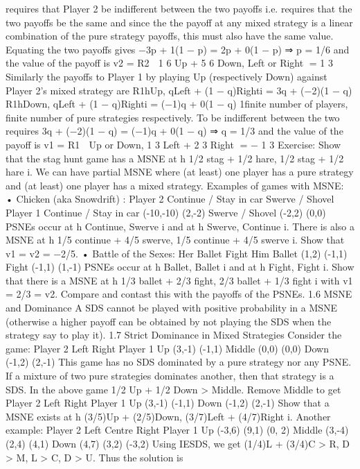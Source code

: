 requires that Player 2 be indifferent between the two payoffs i.e. requires that the two
payoffs be the same and since the the payoff at any mixed strategy is a linear combination
of the pure strategy payoffs, this must also have the same value. Equating the two payoffs
gives
−3p + 1(1 − p) = 2p + 0(1 − p)
⇒ p = 1/6
and the value of the payoff is
v2 = R2

1
6
Up + 5
6
Down, Left or Right
=
1
3
Similarly the payoffs to Player 1 by playing Up (respectively Down) against Player 2’s
mixed strategy are
R1hUp, qLeft + (1 − q)Righti = 3q + (−2)(1 − q)
R1hDown, qLeft + (1 − q)Righti = (−1)q + 0(1 − q)
1finite number of players, finite number of pure strategies
respectively. To be indifferent between the two requires
3q + (−2)(1 − q) = (−1)q + 0(1 − q)
⇒ q = 1/3
and the value of the payoff is
v1 = R1

Up or Down,
1
3
Left + 2
3
Right
= −
1
3
Exercise: Show that the stag hunt game has a MSNE at h 1/2 stag + 1/2 hare, 1/2 stag
+ 1/2 hare i.
We can have partial MSNE where (at least) one player has a pure strategy and (at least)
one player has a mixed strategy.
Examples of games with MSNE:
• Chicken (aka Snowdrift) :
Player 2
Continue / Stay in car Swerve / Shovel
Player 1 Continue / Stay in car (-10,-10) (2,-2)
Swerve / Shovel (-2,2) (0,0)
PSNEs occur at h Continue, Swerve i and at h Swerve, Continue i. There is also
a MSNE at h 1/5 continue + 4/5 swerve, 1/5 continue + 4/5 swerve i. Show that
v1 = v2 = −2/5.
• Battle of the Sexes:
Her
Ballet Fight
Him Ballet (1,2) (-1,1)
Fight (-1,1) (1,-1)
PSNEs occur at h Ballet, Ballet i and at h Fight, Fight i. Show that there is a
MSNE at h 1/3 ballet + 2/3 fight, 2/3 ballet + 1/3 fight i with v1 = 2/3 = v2.
Compare and contast this with the payoffs of the PSNEs.
1.6 MSNE and Dominance
A SDS cannot be played with positive probability in a MSNE (otherwise a higher payoff
can be obtained by not playing the SDS when the strategy say to play it).
1.7 Strict Dominance in Mixed Strategies
Consider the game:
Player 2
Left Right
Player 1
Up (3,-1) (-1,1)
Middle (0,0) (0,0)
Down (-1,2) (2,-1)
This game has no SDS dominated by a pure strategy nor any PSNE. If a mixture of two
pure strategies dominates another, then that strategy is a SDS.
In the above game 1/2 Up + 1/2 Down > Middle. Remove Middle to get
Player 2
Left Right
Player 1 Up (3,-1) (-1,1)
Down (-1,2) (2,-1)
Show that a MSNE exists at h (3/5)Up + (2/5)Down, (3/7)Left + (4/7)Right i.
Another example:
Player 2
Left Centre Right
Player 1
Up (-3,6) (9,1) (0, 2)
Middle (3,-4) (2,4) (4,1)
Down (4,7) (3,2) (-3,2)
Using IESDS, we get (1/4)L + (3/4)C > R, D > M, L > C, D > U. Thus the solution is
